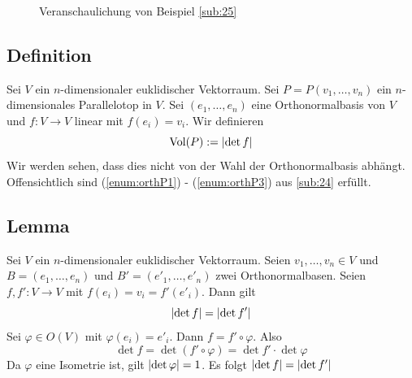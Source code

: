 \begin{figure}[h]
	\caption{Veranschaulichung von Beispiel \ref{sub:25}}
\end{figure}

\subsection[Definition des Volumen per Determinante]{Definition} %
\label{sub:26}
Sei $V$ ein $n$-dimensionaler euklidischer Vektorraum. Sei $P=P(v_1, \ldots , v_n)$ ein $n$-dimensionales Parallelotop in $V$. Sei $(e_1, \ldots , e_n)$ eine
Orthonormalbasis von $V$ und $f : V \to V$ linear mit $f(e_i)=v_i$. Wir definieren 
\[
	\operatorname{Vol}(P) := \lvert\det f\rvert 
\]
Wir werden sehen, dass dies nicht von der Wahl der Orthonormalbasis abhängt. Offensichtlich sind (\ref{enum:orthP1}) - (\ref{enum:orthP3}) aus \ref{sub:24} erfüllt.

\subsection[Lemma über die betragliche Gleichheit von Determinanten]{Lemma} %
\label{sub:27}
Sei $V$ ein $n$-dimensionaler euklidischer Vektorraum. Seien $v_1, \ldots , v_n \in V$ und $B=(e_1, \ldots , e_n)$ und $B'=(e'_1 , \ldots , e'_n)$ zwei Orthonormalbasen.
Seien $f,f' : V \to V$ mit $f(e_i)= v_i = f'(e'_i)$. Dann gilt
\[
	\lvert\det f\rvert = \lvert\det f'\rvert  
\]
Sei $\varphi \in O(V)$ mit $\varphi(e_i) = e'_i$. Dann $f = f' \circ \varphi$. Also 
\[
	\det f = \det ( f' \circ \varphi) = \det f' \cdot \det \varphi
\]
Da $\varphi$ eine Isometrie ist, gilt  $\lvert\det \varphi\rvert = 1 $. Es folgt $\lvert\det f\rvert = \lvert\det f'\rvert  $ \bewende

